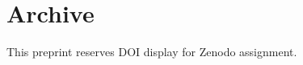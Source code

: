 \documentclass[config/load-project=false,document/type=paper,metadata/author={INSR Example Author},metadata/institution={INSR Example Institution},metadata/title={Zenodo Preprint Example},publication/type={Preprint},publication/doi={pending},publication/repository={https://zenodo.org/records/example},publication/license={CC BY 4.0}]{insr}
\begin{document}
\INSRMakeTitle\section{Archive}This preprint reserves DOI display for Zenodo assignment.
\end{document}
